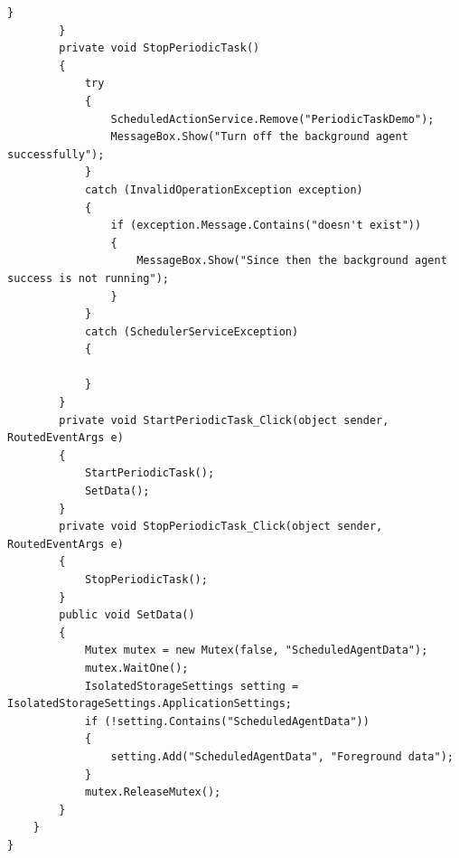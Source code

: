 \documentclass[a4paper,10pt]{scrreprt}
\begin{document}
\begin{lstlisting}[caption=Agent]
            } 
        } 
        private void StopPeriodicTask() 
        { 
            try 
            { 
                ScheduledActionService.Remove("PeriodicTaskDemo"); 
                MessageBox.Show("Turn off the background agent successfully"); 
            } 
            catch (InvalidOperationException exception) 
            { 
                if (exception.Message.Contains("doesn't exist")) 
                { 
                    MessageBox.Show("Since then the background agent success is not running"); 
                } 
            } 
            catch (SchedulerServiceException) 
            { 
                  
            }  
        } 
        private void StartPeriodicTask_Click(object sender, RoutedEventArgs e) 
        { 
            StartPeriodicTask(); 
            SetData(); 
        } 
        private void StopPeriodicTask_Click(object sender, RoutedEventArgs e) 
        { 
            StopPeriodicTask(); 
        } 
        public void SetData() 
        { 
            Mutex mutex = new Mutex(false, "ScheduledAgentData"); 
            mutex.WaitOne(); 
            IsolatedStorageSettings setting = IsolatedStorageSettings.ApplicationSettings; 
            if (!setting.Contains("ScheduledAgentData")) 
            { 
                setting.Add("ScheduledAgentData", "Foreground data"); 
            } 
            mutex.ReleaseMutex(); 
        } 
    } 
}
\end{lstlisting}
\end{document}
